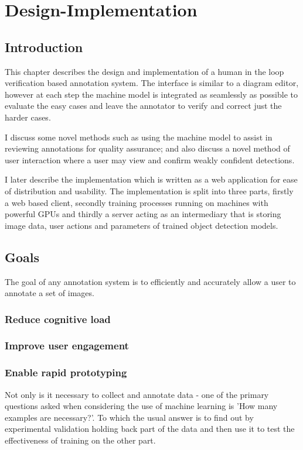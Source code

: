 \chapter{Design-Implementation}
\label{chap:design} 

\section{Introduction}

This chapter describes the design and implementation of a human in the loop verification based annotation system. The interface is similar to a diagram editor, however at each step the machine model is integrated as seamlessly as possible to evaluate the easy cases and leave the annotator to verify and correct just the harder cases. 

I discuss some novel methods such as using the machine model to assist in reviewing annotations for quality assurance; and also discuss a novel method of user interaction where a user may view and confirm weakly confident detections. 

I later describe the implementation which is written as a web application for ease of distribution and usability. The implementation is split into three parts, firstly a web based client, secondly training processes running on machines with powerful \gls{GPU}s and thirdly a server acting as an intermediary that is storing image data, user actions and parameters of trained object detection models.

\section {Goals}

The goal of any annotation system is to efficiently and accurately allow a user to annotate a set of images.

\subsection {Reduce cognitive load}

\subsection {Improve user engagement}

\subsection {Enable rapid prototyping}
Not only is it necessary to collect and annotate data - one of the primary questions asked when considering the use of machine learning is 'How many examples are necessary?'. To which the usual answer is to find out by experimental validation holding back  part of the data and then use it to test the effectiveness of training on the other part.


